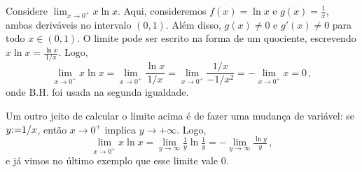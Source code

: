 \begin{ex}\label{Ex:xlogxemzero}
Considere $\lim_{x\to 0^+}x\ln x$. Aqui, consideremos $f(x)=\ln x$ e
$g(x)=\tfrac1x$, ambas deriváveis no intervalo $(0,1)$. Além disso, $g(x)\neq
0$ e $g'(x)\neq 0$ para todo  $x\in (0,1)$.
O limite pode ser escrito na forma de um quociente, escrevendo 
$x\ln x=\frac{\ln x}{1/x}$. Logo,
$$\lim_{x\to 0^+}x\ln x=\lim_{x\to 0^+}\frac{\ln x}{1/x}=
\lim_{x\to 0^+}\frac{1/x}{-1/x^2}=-\lim_{x\to 0^+}x=0\,,
$$
onde B.H. foi usada na segunda igualdade.

Um outro jeito de calcular o limite acima é de fazer uma mudança de variável:
se $y{:=} 1/x$, então $x\to 0^+$ implica $y\to
+\infty$. Logo, 
$$
\lim_{x\to 0^+}x\ln x=\lim_{y\to \infty}\tfrac{1}{y}\ln \tfrac{1}{y}
=-\lim_{y\to \infty}\tfrac{\ln y}{y}\,,
$$
e já vimos no último exemplo que esse limite vale $0$.
\end{ex}


